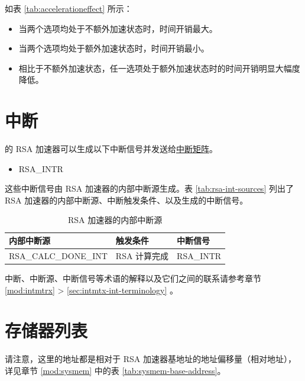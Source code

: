 \documentclass[main\_\_CN.tex]{subfiles}
\begin{document}
如表 \ref{tab:accelerationeffect} 所示：
\begin{itemize}
    \item 当两个选项均处于不额外加速状态时，时间开销最大。
    \item 当两个选项均处于额外加速状态时，时间开销最小。
    \item 相比于不额外加速状态，任一选项处于额外加速状态时的时间开销明显大幅度降低。
\end{itemize}



\section{中断}

\chipname{} 的 RSA 加速器可以生成以下中断信号并发送给\hyperref[mod:intmtrx]{中断矩阵}。

    \begin{itemize}
        \item RSA\_INTR
    \end{itemize}

这些中断信号由 RSA 加速器的内部中断源生成。表 \ref{tab:rsa-int-sources} 列出了 RSA 加速器的内部中断源、中断触发条件、以及生成的中断信号。

\begin{longtable}{ | L{5cm} | L{6.5cm} | L{4cm} | }
\caption{RSA 加速器的内部中断源} \label{tab:rsa-int-sources}
\\ \hline
{}
\textbf{内部中断源} & \textbf{触发条件}  &  \textbf{中断信号}\\ \hline
\label{int:RSACALCDONEINT}RSA\_CALC\_DONE\_INT  &  RSA 计算完成 &  RSA\_INTR  \\ \hline
\end{longtable}

\begin{tiplisting}
中断、中断源、中断信号等术语的解释以及它们之间的联系请参考章节 \ref{mod:intmtrx} \textit{} > \ref{sec:intmtx-int-terminology} \textit{}。
\end{tiplisting}


\newpage
\section{存储器列表 }\label{sec:mem-sum}
请注意，这里的地址都是相对于 RSA 加速器基地址的地址偏移量（相对地址），详见章节 \ref{mod:sysmem} \textit{} 中的表 \ref{tab:sysmem-base-address}。
\end{document}
